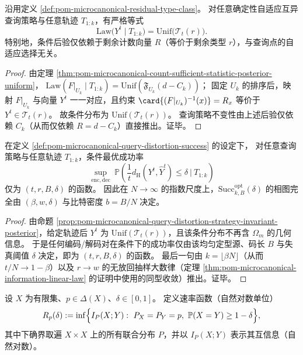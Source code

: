 \begin{proposition}\label{prop:pom-microcanonical-query-distortion-strategy-invariant-posterior}
沿用定义 \ref{def:pom-microcanonical-residual-type-class}。
对任意确定性自适应互异查询策略与任意轨迹 \(T_{1:k}\)，有严格等式
\[
\mathrm{Law}\bigl(Y^t\mid T_{1:k}\bigr)=\mathrm{Unif}\bigl(\mathcal{T}_t(r)\bigr).
\]
特别地，条件后验仅依赖于剩余计数向量 \(R\)（等价于剩余类型 \(r\)），与查询点的自适应选择无关。
\end{proposition}
\begin{proof}
由定理 \ref{thm:pom-microcanonical-count-sufficient-statistic-posterior-uniform}，
\(
\mathrm{Law}(F|_{U_k}\mid T_{1:k})=\mathrm{Unif}(\mathfrak{F}_{U_k}(d-C_k))
\)；
固定 \(U_k\) 的排序后，映射 \(F|_{U_k}\) 与向量 \(Y^t\) 一一对应，且约束 \(\card{(F|_{U_k})^{-1}(x)}=R_x\) 等价于 \(Y^t\in\mathcal{T}_t(r)\)。
故条件分布为 \(\mathrm{Unif}(\mathcal{T}_t(r))\)。
查询策略不变性由上述后验仅依赖 \(C_k\)（从而仅依赖 \(R=d-C_k\)）直接推出。证毕。
\end{proof}

\begin{proposition}[查询—失真任务的充分统计]\label{prop:pom-microcanonical-query-distortion-sufficient-statistic}
在定义 \ref{def:pom-microcanonical-query-distortion-success} 的设定下，
对任意查询策略与任意轨迹 \(T_{1:k}\)，条件最优成功率
\[
\sup_{\mathrm{enc},\mathrm{dec}}\ \mathbb{P}\!\left(\frac{1}{t}d_{\mathrm H}(Y^t,\widehat Y^t)\le \delta\ \Big|\ T_{1:k}\right)
\]
仅为 \((t,r,B,\delta)\) 的函数。
因此在 \(N\to\infty\) 的指数尺度上，\(\mathrm{Succ}^{\mathrm{opt}}_{k,B}(\delta)\) 的相图完全由 \((\beta,w,\delta)\) 与比特密度 \(b=B/N\) 决定。
\end{proposition}
\begin{proof}
由命题 \ref{prop:pom-microcanonical-query-distortion-strategy-invariant-posterior}，给定轨迹后 \(Y^t\) 为 \(\mathrm{Unif}(\mathcal{T}_t(r))\)，且该条件分布不再含 \(\Omega_m\) 的几何信息。
于是任何编码/解码对在条件下的成功率仅由该均匀定型源、码长 \(B\) 与失真阈值 \(\delta\) 决定，即为 \((t,r,B,\delta)\) 的函数。
最后一句由 \(k=\lfloor\beta N\rfloor\)（从而 \(t/N\to 1-\beta\)）以及 \(r\to w\) 的无放回抽样大数律（定理 \ref{thm:pom-microcanonical-information-linear-law} 的证明中使用的同型收敛）推出。证毕。
\end{proof}

\begin{definition}[定型—对角约束速率函数]\label{def:pom-typed-diagonal-rate-function}
设 \(X\) 为有限集、\(p\in\Delta(X)\)、\(\delta\in[0,1]\)。
定义速率函数（自然对数单位）
\[
R_p(\delta)
:=\inf\Bigl\{I_P(X;Y):\ P_X=P_Y=p,\ \mathbb{P}(X=Y)\ge 1-\delta\Bigr\},
\]
其中下确界取遍 \(X\times X\) 上的所有联合分布 \(P\)，并以 \(I_P(X;Y)\) 表示其互信息（自然对数）。
\end{definition}

